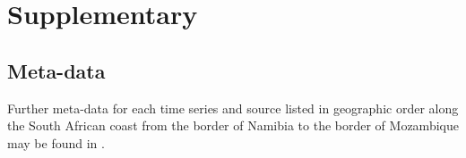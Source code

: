 \documentclass[a4paper,10pt,review]{elsarticle}
\begin{document}
\newcommand{\beginsupplement}{%
        \setcounter{table}{0}
        \renewcommand{\thetable}{S\arabic{table}}%
        \setcounter{figure}{0}
        \renewcommand{\thefigure}{S\arabic{figure}}%
     }
\beginsupplement

\section*{Supplementary}
\subsection*{Meta-data}
Further meta-data for each time series and source listed in geographic order along the South African coast from the border of Namibia to the border of Mozambique may be found in .
\end{document}

